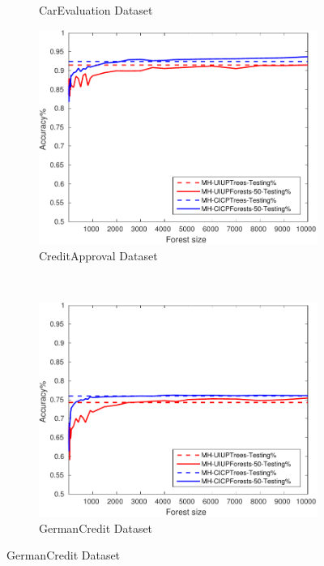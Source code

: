 \begin{figure}[ht]
\begin{subfigure}[b]{0.3\textwidth}
  	\caption{CarEvaluation Dataset}
		\label{fig:Car4}
	\end{subfigure}
  \begin{subfigure}[b]{0.3\textwidth}
		\centering
  	\includegraphics[width=\textwidth]{figs/PLPTF/Forests/CreditApprovalDownsampledFurther_Forests_MH.pdf}
  	\caption{CreditApproval Dataset}
		\label{fig:Crd4}
	\end{subfigure}
  \\
  \begin{subfigure}[b]{0.3\textwidth}
		\centering
  	\includegraphics[width=\textwidth]{figs/PLPTF/Forests/GermanCreditDownsampledFurther_Forests_MH.pdf}
  	\caption{GermanCredit Dataset}

\end{subfigure}
\end{figure}
